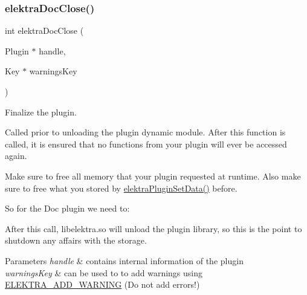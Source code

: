 \subsubsection{\texorpdfstring{elektraDocClose()}{elektraDocClose()}}
{\footnotesize\ttfamily int elektra\+Doc\+Close (\begin{DoxyParamCaption}\item[{Plugin $\ast$}]{handle,  }\item[{Key $\ast$}]{warnings\+Key }\end{DoxyParamCaption})}



Finalize the plugin. 

Called prior to unloading the plugin dynamic module. After this function is called, it is ensured that no functions from your plugin will ever be accessed again.

Make sure to free all memory that your plugin requested at runtime. Also make sure to free what you stored by \mbox{\hyperlink{group__plugin_gaf4b941a52ff55d0ca2a9158d90208ef2}{elektra\+Plugin\+Set\+Data()}} before.

So for the Doc plugin we need to\+:


\begin{DoxyCodeInclude}{0}
\DoxyCodeLine{\{}
\DoxyCodeLine{}
\DoxyCodeLine{\}}
\end{DoxyCodeInclude}
 After this call, libelektra.\+so will unload the plugin library, so this is the point to shutdown any affairs with the storage.


\begin{DoxyParams}{Parameters}
{\em handle} & contains internal information of the plugin \\
\hline
{\em warnings\+Key} & can be used to to add warnings using \mbox{\hyperlink{group__plugin_ga3da3bdb0f41710adda9eee3d7adac9ff}{E\+L\+E\+K\+T\+R\+A\+\_\+\+A\+D\+D\+\_\+\+W\+A\+R\+N\+I\+NG}} (Do not add errors!)\\
\hline
\end{DoxyParams}

